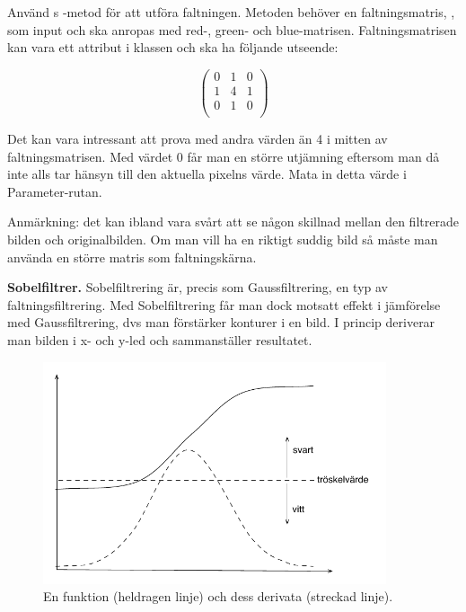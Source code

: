Använd s -metod för att utföra faltningen. Metoden behöver en faltningsmatris, , som input och ska anropas med red-, green- och blue-matrisen. Faltningsmatrisen kan vara ett attribut i klassen och ska ha följande utseende:

\begin{displaymath}
\begin{pmatrix}
  0 & 1 & 0 \\
  1 & 4 & 1 \\
  0 & 1 & 0 \\
\end{pmatrix}
\end{displaymath}

Det kan vara intressant att prova med andra värden än 4 i mitten av faltningsmatrisen. Med värdet 0 får man en större utjämning eftersom man då inte alls tar hänsyn till den aktuella pixelns värde. Mata in detta värde i Parameter-rutan. 

Anmärkning: det kan ibland vara svårt att se någon skillnad mellan den filtrerade bilden och originalbilden. Om man vill ha en riktigt suddig bild så måste man använda en större matris som faltningskärna.


\Task  \textbf{Sobelfiltrer.} Sobelfiltrering är, precis som Gaussfiltrering, en typ av faltningsfiltrering. Med Sobelfiltrering får man dock motsatt effekt i jämförelse med Gaussfiltrering, dvs man förstärker konturer i en bild. I princip deriverar man bilden i x- och y-led och sammanställer resultatet.

\begin{figure}[H]
\includegraphics[width=0.9\textwidth]{../img/w13-assignment-imageprocessing/derivatabild2.pdf}
\caption { En funktion (heldragen linje) och dess derivata (streckad linje).}
\label{fig:imageprocessing:sobelfilter:derivatabild}
\end{figure}

